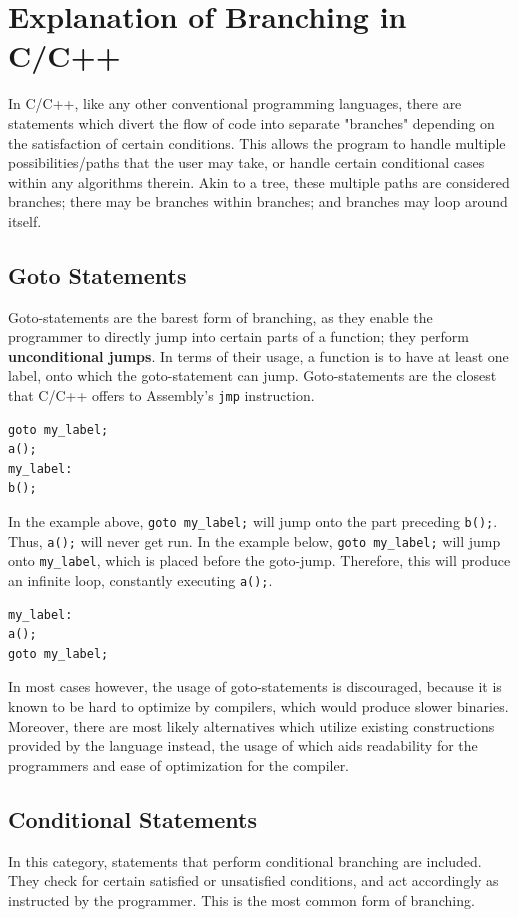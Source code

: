 \documentclass[12pt]{article}
\begin{document}
\pagebreak
\section{Explanation of Branching in C/C++}
In C/C++, like any other conventional programming languages, there are statements which divert the flow of code into separate "branches" depending on the satisfaction of certain conditions. This allows the program to handle multiple possibilities/paths that the user may take, or handle certain conditional cases within any algorithms therein. Akin to a tree, these multiple paths are considered branches; there may be branches within branches; and branches may loop around itself.

\subsection{Goto Statements}

Goto-statements are the barest form of branching, as they enable the programmer to directly jump into certain parts of a function; they perform \textbf{unconditional jumps}. In terms of their usage, a function is to have at least one label, onto which the goto-statement can jump. Goto-statements are the closest that C/C++ offers to Assembly's \texttt{jmp} instruction.

\begin{verbatim}
goto my_label;
a();
my_label:
b();
\end{verbatim}

In the example above, \texttt{goto my\_label;} will jump onto the part preceding \texttt{b();}. Thus, \texttt{a();} will never get run. In the example below, \texttt{goto my\_label;} will jump onto \texttt{my\_label}, which is placed before the goto-jump. Therefore, this will produce an infinite loop, constantly executing \texttt{a();}.

\begin{verbatim}
my_label:
a();
goto my_label;
\end{verbatim}

In most cases however, the usage of goto-statements is discouraged, because it is known to be hard to optimize by compilers, which would produce slower binaries. Moreover, there are most likely alternatives which utilize existing constructions provided by the language instead, the usage of which aids readability for the programmers and ease of optimization for the compiler.

\subsection{Conditional Statements}
In this category, statements that perform conditional branching are included. They check for certain satisfied or unsatisfied conditions, and act accordingly as instructed by the programmer. This is the most common form of branching.
\end{document}
